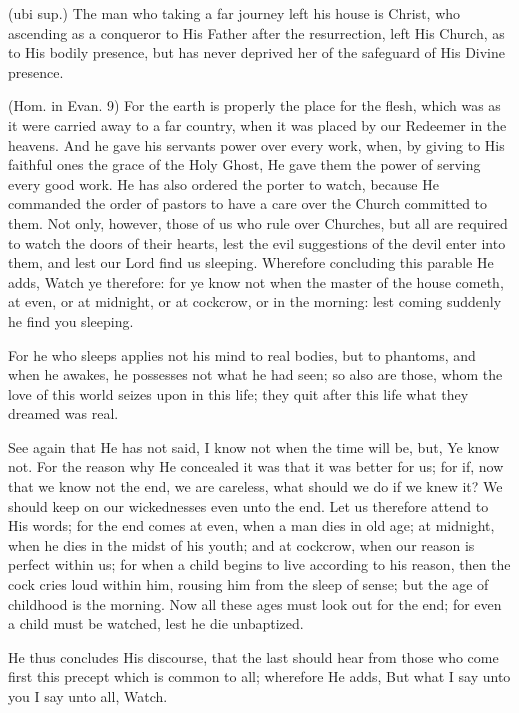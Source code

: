  (ubi sup.) The man who taking a far journey left his house is Christ, who ascending as a conqueror to His Father after the resurrection, left His Church, as to His bodily presence, but has never deprived her of the safeguard of His Divine presence.

 (Hom. in Evan. 9) For the earth is properly the place for the flesh, which was as it were carried away to a far country, when it was placed by our Redeemer in the heavens. And he gave his servants power over every work, when, by giving to His faithful ones the grace of the Holy Ghost, He gave them the power of serving every good work. He has also ordered the porter to watch, because He commanded the order of pastors to have a care over the Church committed to them. Not only, however, those of us who rule over Churches, but all are required to watch the doors of their hearts, lest the evil suggestions of the devil enter into them, and lest our Lord find us sleeping. Wherefore concluding this parable He adds, Watch ye therefore: for ye know not when the master of the house cometh, at even, or at midnight, or at cockcrow, or in the morning: lest coming suddenly he find you sleeping.

 For he who sleeps applies not his mind to real bodies, but to phantoms, and when he awakes, he possesses not what he had seen; so also are those, whom the love of this world seizes upon in this life; they quit after this life what they dreamed was real.

 See again that He has not said, I know not when the time will be, but, Ye know not. For the reason why He concealed it was that it was better for us; for if, now that we know not the end, we are careless, what should we do if we knew it? We should keep on our wickednesses even unto the end. Let us therefore attend to His words; for the end comes at even, when a man dies in old age; at midnight, when he dies in the midst of his youth; and at cockcrow, when our reason is perfect within us; for when a child begins to live according to his reason, then the cock cries loud within him, rousing him from the sleep of sense; but the age of childhood is the morning. Now all these ages must look out for the end; for even a child must be watched, lest he die unbaptized.

 He thus concludes His discourse, that the last should hear from those who come first this precept which is common to all; wherefore He adds, But what I say unto you I say unto all, Watch.

